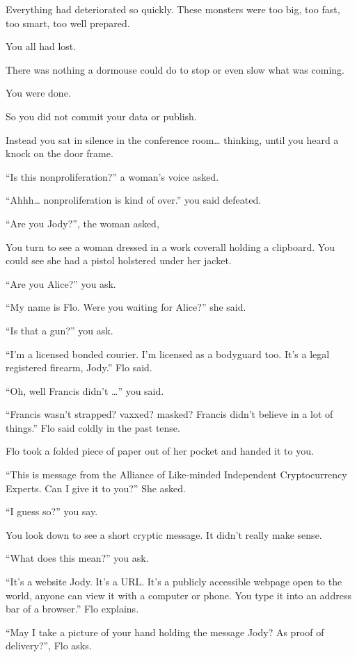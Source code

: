 \documentclass[17pt, twoside, a5paper, openright, extrafontsizes]{memoir}
\begin{document}
Everything had deteriorated so quickly. These monsters were too big, too
fast, too smart, too well prepared.

You all had lost.

There was nothing a dormouse could do to stop or even slow what was
coming.

You were done.

So you did not commit your data or publish.

Instead you sat in silence in the conference room\ldots{} thinking,
until you heard a knock on the door frame.

``Is this nonproliferation?'' a woman's voice asked.

``Ahhh\ldots{} nonproliferation is kind of over.'' you said defeated.

``Are you Jody?'', the woman asked,

You turn to see a woman dressed in a work coverall holding a clipboard.
You could see she had a pistol holstered under her jacket.

``Are you Alice?'' you ask.

``My name is Flo. Were you waiting for Alice?'' she said.

``Is that a gun?'' you ask.

``I'm a licensed bonded courier. I'm licensed as a bodyguard too. It's a
legal registered firearm, Jody.'' Flo said.

``Oh, well Francis didn't \ldots{}'' you said.

``Francis wasn't strapped? vaxxed? masked? Francis didn't believe in a
lot of things.'' Flo said coldly in the past tense.

Flo took a folded piece of paper out of her pocket and handed it to you.

``This is message from the Alliance of Like-minded Independent
Cryptocurrency Experts. Can I give it to you?'' She asked.

``I guess so?'' you say.

You look down to see a short cryptic message. It didn't really make
sense.

``What does this mean?'' you ask.

``It's a website Jody. It's a URL. It's a publicly accessible webpage
open to the world, anyone can view it with a computer or phone. You type
it into an address bar of a browser.'' Flo explains.

``May I take a picture of your hand holding the message Jody? As proof
of delivery?'', Flo asks.
\end{document}
